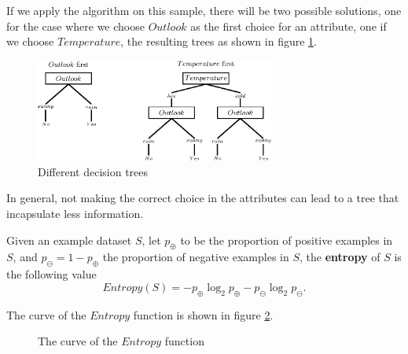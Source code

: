 \documentclass[10pt, letterpaper]{report}
\begin{document}
If we apply the algorithm on this sample, there will be two possible solutions, one for the case where we choose $Outlook$ as the first choice for an attribute, one if we choose $Temperature$, the resulting trees as shown in figure \ref{img:tennis_criteria}.

\begin{figure}[h!]
	\centering
	\includegraphics[width=0.7\textwidth]{images/tennis_criteria.eps}
	\caption{Different decision trees}
	\label{img:tennis_criteria}
\end{figure}

In general, not making the correct choice in the attributes can lead to a tree that incapsulate less information.  \begin{definition}
	Given an example dataset $S$, let $p_\oplus$ to be the proportion of positive examples in $S$, and $p_\ominus=1-p_\oplus$  the proportion of negative examples in $S$, the \textbf{entropy} of $S$ is the following value\begin{equation}
		Entropy(S)=-p_\oplus\log_2p_\oplus-p_\ominus\log_2p_\ominus.
	\end{equation}
\end{definition}
The curve of the $Entropy$ function is shown in figure \ref{fig:entropia_binaria}.
\begin{figure}[h!]
	\centering
	\caption{The curve of the $Entropy$ function}
	\label{fig:entropia_binaria}
\end{figure}
\end{document}
